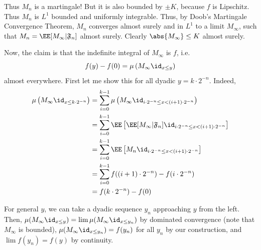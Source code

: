 \documentclass[11pt, headheight=30pt]{scrartcl}
\begin{document}
Thus $M_n$ is a martingale! But it is also bounded by $\pm K$, because $f$ is Lipschitz.
Thus $M_n$ is $L^1$ bounded and uniformly integrable.
Thus, by Doob's Martingale Convergence Theorem, $M_n$ converges almost surely
and in $L^1$ to a limit $M_\infty$, such that $M_n = \EE[M_\infty | \mathfrak{F}_n]$
almost surely. Clearly $\abs{M_\infty} \leq K$ almost surely.

Now, the claim is that the indefinite integral of $M_\infty$ is $f$, i.e.
\[
    f(y) - f(0) = \mu\left(M_\infty \id_{x \leq y}\right)
\]
almost everywhere. First let me show this for all dyadic $y = k\cdot 2^{-n}$.
Indeed,
\begin{align*}
    \mu\left(M_\infty \id_{x \leq k\cdot 2^{-n}}\right)
    &= \sum_{i = 0}^{k-1} \mu\left(M_\infty \id_{i \cdot 2^{-n}\leq x < (i+1)\cdot 2^{-n}}\right)\\
    &= \sum_{i = 0}^{k-1} \EE\left[\EE[M_\infty | \mathfrak{F}_n] \id_{i \cdot 2^{-n}\leq x < (i+1)\cdot 2^{-n}}\right]\\
    &= \sum_{i = 0}^{k-1} \EE\left[M_n \id_{i \cdot 2^{-n}\leq x < (i+1)\cdot 2^{-n}}\right]\\
    &= \sum_{i = 0}^{k-1} f((i+1)\cdot 2^{-n}) - f(i\cdot 2^{-n})\\
    &= f(k\cdot 2^{-n}) - f(0)
\end{align*}


For general $y$, we can take a dyadic sequence $y_n$ approaching
$y$ from the left. Then, $\mu(M_\infty \id_{x\leq y}) = \lim \mu(M_\infty \id_{x\leq y_n})$
by dominated convergence (note that $M_\infty$ is bounded), $\mu(M_\infty \id_{x\leq y_n}) = f(y_n)$
for all $y_n$ by our construction, and $\lim f(y_n) = f(y)$ by continuity.
\end{document}
